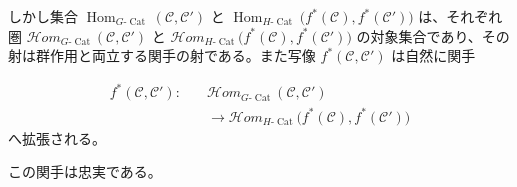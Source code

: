 しかし集合\allowbreak
$\operatorname{Hom}_{G\text{-}\operatorname{Cat}}(\mathcal C,\mathcal C')$\allowbreak
と\allowbreak
$\operatorname{Hom}_{H\text{-}\operatorname{Cat}}
\bigl(f^*(\mathcal C),f^*(\mathcal C')\bigr)$\allowbreak
は、それぞれ圏\hfill\break
$\mathcal H\!om_{G\text{-}\operatorname{Cat}}(\mathcal C,\mathcal C')$\allowbreak
と\allowbreak
$\mathcal H\!om_{H\text{-}\operatorname{Cat}}
\bigl(f^*(\mathcal C),f^*(\mathcal C')\bigr)$\allowbreak
の対象集合であり、その射は群作用と両立する関手の射である。また写像
$f^*(\mathcal C,\mathcal C')$ は自然に関手

\begin{equation}
  \begin{aligned}
    f^*(\mathcal C,\mathcal C')\colon\quad
      &\mathcal H\!om_{G\text{-}\operatorname{Cat}}
        (\mathcal C,\mathcal C')\\
      &\longrightarrow
        \mathcal H\!om_{H\text{-}\operatorname{Cat}}
        \bigl(f^*(\mathcal C),f^*(\mathcal C')\bigr)
  \end{aligned}
  \tag{1.4.1.5}
\end{equation}
へ拡張される。

この関手は忠実である。
